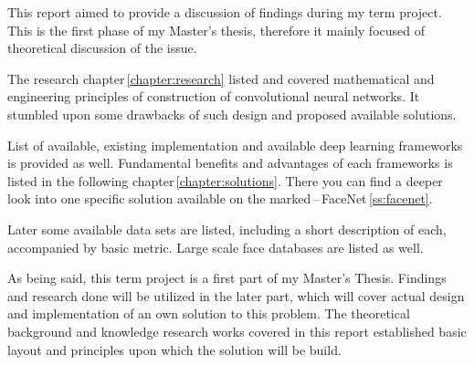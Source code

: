 This report aimed to provide a discussion of findings during my term project. This is the first phase of my Master's thesis, therefore it mainly focused of theoretical discussion of the issue.

The research chapter\,\ref{chapter:research} listed and covered mathematical and engineering principles of construction of convolutional neural networks. It stumbled upon some drawbacks of such design and proposed available solutions.

List of available, existing implementation and available deep learning frameworks is provided as well. Fundamental benefits and advantages of each frameworks is listed in the following chapter\,\ref{chapter:solutions}. There you can find a deeper look into one specific solution available on the marked\,--\,FaceNet\,\ref{ss:facenet}.

Later some available data sets are listed, including a short description of each, accompanied by basic metric. Large scale face databases are listed as well.

As being said, this term project is a first part of my Master's Thesis. Findings and research done will be utilized in the later part, which will cover actual design and implementation of an own solution to this problem. The theoretical background and knowledge research works covered in this report established basic layout and principles upon which the solution will be build.
